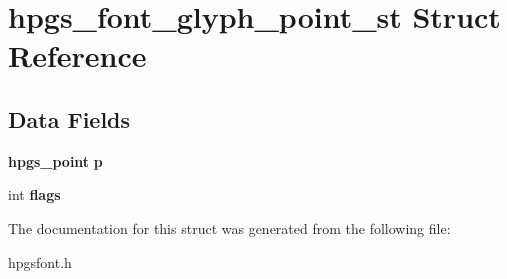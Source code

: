 \section{hpgs\_\-font\_\-glyph\_\-point\_\-st Struct Reference}
\label{structhpgs__font__glyph__point__st}
\subsection*{Data Fields}
\begin{DoxyCompactItemize}
\item 
{\bf hpgs\_\-point} {\bfseries p}\label{structhpgs__font__glyph__point__st_a571bf6853d30caa4f634b3e9c3459aee}

\item 
int {\bfseries flags}\label{structhpgs__font__glyph__point__st_a3f7cf6e06b79d8b84a31f22f8b9a594a}

\end{DoxyCompactItemize}


The documentation for this struct was generated from the following file:\begin{DoxyCompactItemize}
\item 
hpgsfont.h\end{DoxyCompactItemize}
